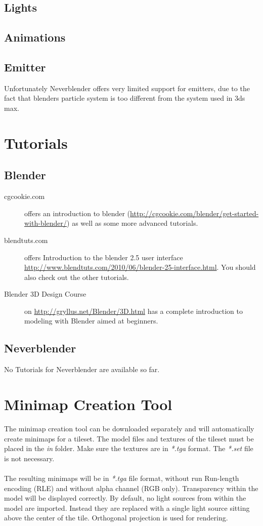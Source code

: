 \documentclass[a4paper]{article}
\begin{document}
\subsection{Lights}

\subsection{Animations}

\subsection{Emitter}
Unfortunately Neverblender offers very limited support for emitters, due to the fact that blenders particle system is too  different from the system used in 3ds max.
\section{Tutorials}

\subsection{Blender}
\begin{description}
    \item[cgcookie.com] offers an introduction to blender (\url{http://cgcookie.com/blender/get-started-with-blender/}) as well as some more advanced tutorials.
    \item[blendtuts.com] offers Introduction to the blender 2.5 user interface \url{http://www.blendtuts.com/2010/06/blender-25-interface.html}. You should also check out the other tutorials.
    \item[Blender 3D Design Course] on \url{http://gryllus.net/Blender/3D.html} has a complete introduction to modeling with Blender aimed at beginners.
\end{description}

\subsection{Neverblender}
No Tutorials for Neverblender are available so far.

\section{Minimap Creation Tool}
The minimap creation tool can be downloaded separately and will automatically create minimaps for a tileset. The model files and textures of the tileset must be placed in the {\itshape{in}}  folder. Make sure the textures are in {\itshape{*.tga}} format. The {\itshape{*.set}} file is not necessary. \\ \\
The resulting minimaps will be in {\itshape{*.tga}} file format, without run Run-length encoding (RLE) and without alpha channel (RGB only). Transparency within the model will be displayed correctly. By default, no light sources from within the model are imported. Instead they are replaced with a single light source sitting above the center of the tile. Orthogonal projection is used for rendering.
\end{document}
